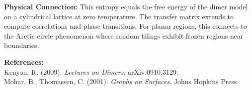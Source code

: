 \begin{technical}
\noindent\textbf{Physical Connection:} This entropy equals the free energy of the dimer model on a cylindrical lattice at zero temperature. The transfer matrix extends to compute correlations and phase transitions. For planar regions, this connects to the Arctic circle phenomenon where random tilings exhibit frozen regions near boundaries.

\vspace{0.5em}
\noindent\textbf{References:}\\
Kenyon, R. (2009). \textit{Lectures on Dimers}. arXiv:0910.3129.\\
Mohar, B., Thomassen, C. (2001). \textit{Graphs on Surfaces}. Johns Hopkins Press.
\end{technical}